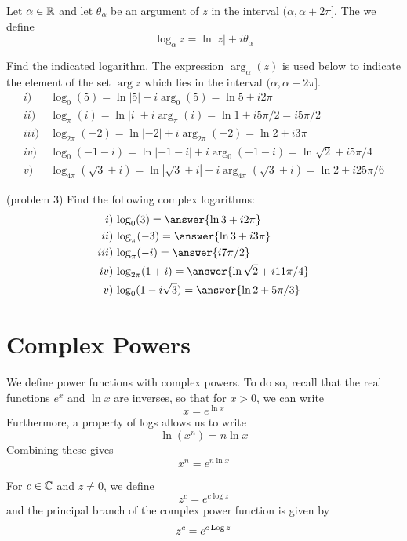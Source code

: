 \documentclass[handout]{ximera}
\begin{document}
\begin{definition}
Let $\alpha \in \mathbb R$ and let $\theta_\alpha$ be an argument of $z$ in the interval $(\alpha, \alpha + 2\pi]$.
The we define
\[
\log_\alpha z = \ln|z| +i\theta_\alpha
\]
\end{definition}


\begin{example}[Example 3] 
Find the indicated logarithm. The expression $\arg_\alpha(z)$ is used below to indicate the element of the set 
$\arg z$ which lies in the interval $(\alpha, \alpha + 2\pi]$.\\
\begin{align*}
i)  \, & \log_0(5) = \ln|5|+ i \arg_0(5) = \ln 5 + i2\pi\\
ii) \,  & \log_\pi(i) = \ln|i|+ i \arg_\pi(i) = \ln 1 + i5\pi/2 = i5\pi/2\\
iii) \,  & \log_{2\pi}(-2) = \ln|-2|+ i \arg_{2\pi}(-2) = \ln 2 + i3\pi\\
iv) \,  & \log_0(-1-i)= \ln|-1-i|+ i \arg_0(-1-i) = \ln \sqrt 2 + i5\pi/4\\
v)  \, & \log_{4\pi}(\sqrt 3 + i) = \ln|\sqrt 3 + i|+ i \arg_{4\pi}(\sqrt 3+i) = \ln 2 + i25\pi/6
\end{align*}
\end{example}


\begin{problem}(problem 3) 
Find the following complex logarithms:\\
\begin{align*}
i) \, & \log_0(3) = \answer{\ln 3 + i2\pi }\\
ii)  \, & \log_\pi(-3) = \answer{\ln 3 + i3\pi}\\
iii) \,  & \log_\pi(-i) = \answer{ i7\pi/2}\\
iv)  \, & \log_{2\pi}(1+i) = \answer{\ln \sqrt 2 +i11\pi/4}\\
v)  \, & \log_0(1- i\sqrt 3) = \answer{\ln 2+ 5\pi/3}
\end{align*}
\end{problem}





\section{Complex Powers}
We define power functions with complex powers. To do so, recall that the real functions $e^x$ and $\ln x$ 
are inverses, so that for $x>0$, we can write
\[
x = e^{\ln x}
\]
Furthermore, a property of logs allows us to write
\[
\ln(x^n) = n \ln x
\]
Combining these gives
\[
x^n = e^{n\ln x}
\]
\begin{definition}
For $c \in \mathbb C$ and $z \neq 0$, we define
\[
z^c = e^{c \log z}
\]
and the principal branch of the complex power function is given by
\[
z^c = e^{c \operatorname{Log} z}
\]
\end{definition}
\end{document}
